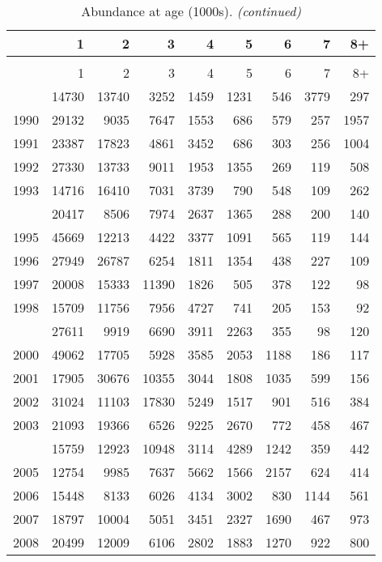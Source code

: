 \documentclass[
]{article}
\begin{document}
\begin{longtable}[t]{lrrrrrrrr}
\caption{\label{tab:NAA-table}Abundance at age (1000s).}\\
\toprule
  & 1 & 2 & 3 & 4 & 5 & 6 & 7 & 8+\\
\midrule
\endfirsthead
\caption[]{Abundance at age (1000s). \textit{(continued)}}\\
\toprule
  & 1 & 2 & 3 & 4 & 5 & 6 & 7 & 8+\\
\midrule
\endhead

\endfoot
\bottomrule
\endlastfoot
1989 & 14730 & 13740 & 3252 & 1459 & 1231 & 546 & 3779 & 297\\
1990 & 29132 & 9035 & 7647 & 1553 & 686 & 579 & 257 & 1957\\
1991 & 23387 & 17823 & 4861 & 3452 & 686 & 303 & 256 & 1004\\
1992 & 27330 & 13733 & 9011 & 1953 & 1355 & 269 & 119 & 508\\
1993 & 14716 & 16410 & 7031 & 3739 & 790 & 548 & 109 & 262\\
\addlinespace
1994 & 20417 & 8506 & 7974 & 2637 & 1365 & 288 & 200 & 140\\
1995 & 45669 & 12213 & 4422 & 3377 & 1091 & 565 & 119 & 144\\
1996 & 27949 & 26787 & 6254 & 1811 & 1354 & 438 & 227 & 109\\
1997 & 20008 & 15333 & 11390 & 1826 & 505 & 378 & 122 & 98\\
1998 & 15709 & 11756 & 7956 & 4727 & 741 & 205 & 153 & 92\\
\addlinespace
1999 & 27611 & 9919 & 6690 & 3911 & 2263 & 355 & 98 & 120\\
2000 & 49062 & 17705 & 5928 & 3585 & 2053 & 1188 & 186 & 117\\
2001 & 17905 & 30676 & 10355 & 3044 & 1808 & 1035 & 599 & 156\\
2002 & 31024 & 11103 & 17830 & 5249 & 1517 & 901 & 516 & 384\\
2003 & 21093 & 19366 & 6526 & 9225 & 2670 & 772 & 458 & 467\\
\addlinespace
2004 & 15759 & 12923 & 10948 & 3114 & 4289 & 1242 & 359 & 442\\
2005 & 12754 & 9985 & 7637 & 5662 & 1566 & 2157 & 624 & 414\\
2006 & 15448 & 8133 & 6026 & 4134 & 3002 & 830 & 1144 & 561\\
2007 & 18797 & 10004 & 5051 & 3451 & 2327 & 1690 & 467 & 973\\
2008 & 20499 & 12009 & 6106 & 2802 & 1883 & 1270 & 922 & 800\\

\end{longtable}
\end{document}

